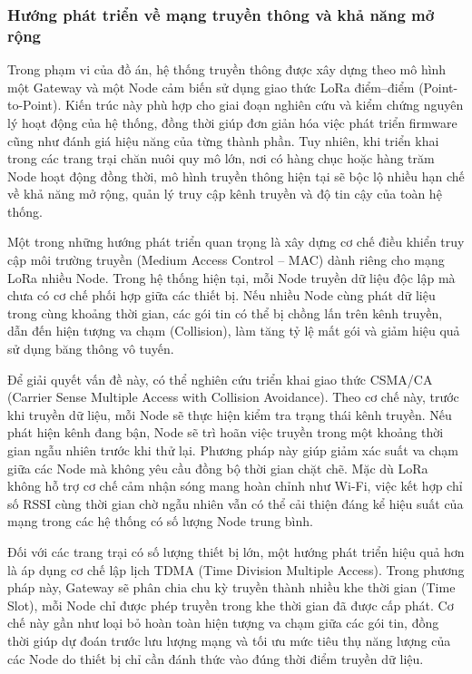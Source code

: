 \subsubsection{Hướng phát triển về mạng truyền thông và khả năng mở rộng}

Trong phạm vi của đồ án, hệ thống truyền thông được xây dựng theo mô hình một Gateway và một Node cảm biến sử dụng giao thức LoRa điểm--điểm (Point-to-Point). Kiến trúc này phù hợp cho giai đoạn nghiên cứu và kiểm chứng nguyên lý hoạt động của hệ thống, đồng thời giúp đơn giản hóa việc phát triển firmware cũng như đánh giá hiệu năng của từng thành phần. Tuy nhiên, khi triển khai trong các trang trại chăn nuôi quy mô lớn, nơi có hàng chục hoặc hàng trăm Node hoạt động đồng thời, mô hình truyền thông hiện tại sẽ bộc lộ nhiều hạn chế về khả năng mở rộng, quản lý truy cập kênh truyền và độ tin cậy của toàn hệ thống.

Một trong những hướng phát triển quan trọng là xây dựng cơ chế điều khiển truy cập môi trường truyền (Medium Access Control -- MAC) dành riêng cho mạng LoRa nhiều Node. Trong hệ thống hiện tại, mỗi Node truyền dữ liệu độc lập mà chưa có cơ chế phối hợp giữa các thiết bị. Nếu nhiều Node cùng phát dữ liệu trong cùng khoảng thời gian, các gói tin có thể bị chồng lấn trên kênh truyền, dẫn đến hiện tượng va chạm (Collision), làm tăng tỷ lệ mất gói và giảm hiệu quả sử dụng băng thông vô tuyến.

Để giải quyết vấn đề này, có thể nghiên cứu triển khai giao thức CSMA/CA (Carrier Sense Multiple Access with Collision Avoidance). Theo cơ chế này, trước khi truyền dữ liệu, mỗi Node sẽ thực hiện kiểm tra trạng thái kênh truyền. Nếu phát hiện kênh đang bận, Node sẽ trì hoãn việc truyền trong một khoảng thời gian ngẫu nhiên trước khi thử lại. Phương pháp này giúp giảm xác suất va chạm giữa các Node mà không yêu cầu đồng bộ thời gian chặt chẽ. Mặc dù LoRa không hỗ trợ cơ chế cảm nhận sóng mang hoàn chỉnh như Wi-Fi, việc kết hợp chỉ số RSSI cùng thời gian chờ ngẫu nhiên vẫn có thể cải thiện đáng kể hiệu suất của mạng trong các hệ thống có số lượng Node trung bình.

Đối với các trang trại có số lượng thiết bị lớn, một hướng phát triển hiệu quả hơn là áp dụng cơ chế lập lịch TDMA (Time Division Multiple Access). Trong phương pháp này, Gateway sẽ phân chia chu kỳ truyền thành nhiều khe thời gian (Time Slot), mỗi Node chỉ được phép truyền trong khe thời gian đã được cấp phát. Cơ chế này gần như loại bỏ hoàn toàn hiện tượng va chạm giữa các gói tin, đồng thời giúp dự đoán trước lưu lượng mạng và tối ưu mức tiêu thụ năng lượng của các Node do thiết bị chỉ cần đánh thức vào đúng thời điểm truyền dữ liệu.


